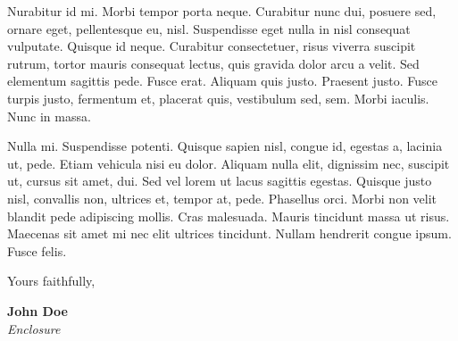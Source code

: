 \documentclass[11pt]{article}
\begin{document}
Nurabitur id mi. Morbi tempor porta neque. Curabitur nunc dui, posuere
sed, ornare eget, pellentesque eu, nisl. Suspendisse eget nulla in nisl
consequat vulputate. Quisque id neque. Curabitur consectetuer, risus
viverra suscipit rutrum, tortor mauris consequat lectus, quis gravida
dolor arcu a velit. Sed elementum sagittis pede. Fusce erat. Aliquam
quis justo. Praesent justo. Fusce turpis justo, fermentum et, placerat
quis, vestibulum sed, sem. Morbi iaculis. Nunc in massa.

Nulla mi. Suspendisse potenti. Quisque sapien nisl, congue id, egestas
a, lacinia ut, pede. Etiam vehicula nisi eu dolor. Aliquam nulla elit,
dignissim nec, suscipit ut, cursus sit amet, dui. Sed vel lorem ut lacus
sagittis egestas. Quisque justo nisl, convallis non, ultrices et, tempor
at, pede. Phasellus orci. Morbi non velit blandit pede adipiscing
mollis. Cras malesuada. Mauris tincidunt massa ut risus. Maecenas sit
amet mi nec elit ultrices tincidunt. Nullam hendrerit congue ipsum.
Fusce felis.

Yours faithfully,

{\bfseries John Doe}\\
%
\vfill%
{\slshape Enclosure}
\end{document}

